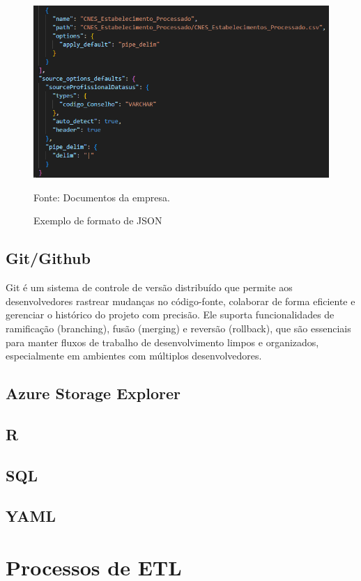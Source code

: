 \begin{figure}[H]
  \centering
  \caption{Exemplo de formato de JSON}\label{fig:jsonformat}
  \includegraphics[width=.6\linewidth]{imagens/json.png}
  \par
  \footnotesize{Fonte: Documentos da empresa.}
\end{figure}

\subsection{Git/Github}

Git é um sistema de controle de versão distribuído que permite aos desenvolvedores rastrear mudanças no código-fonte, colaborar de forma eficiente e gerenciar o histórico do projeto com precisão. Ele suporta funcionalidades de ramificação (branching), fusão (merging) e reversão (rollback), que são essenciais para manter fluxos de trabalho de desenvolvimento limpos e organizados, especialmente em ambientes com múltiplos desenvolvedores. %

\subsection{Azure Storage Explorer}
\subsection{R}
\subsection{SQL}
\subsection{YAML}


\section{Processos de ETL}
